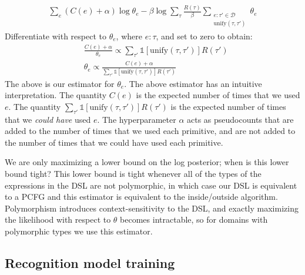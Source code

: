 \documentclass{article}
\newcommand{\indicator}{\mathds{1}} %
\begin{document}
\begin{align}
\sum_e (C(e) + \alpha)\log \theta_e  - \beta\log \sum_\tau\frac{R(\tau)}{\beta}\sum_{\substack{e:\tau'\in \mathcal{D}\\\text{unify}(\tau,\tau')}}\theta_e    
\end{align}
Differentiate with respect to $\theta_e$, where $e:\tau$, and set to zero to obtain:
\begin{align}
  &  \frac{C(e) + \alpha}{\theta_e}\propto\sum_{\tau'}\indicator\left[\text{unify}(\tau,\tau') \right] R(\tau')\\
&  \theta_e\propto\frac{C(e) + \alpha}{\sum_{\tau'}\indicator\left[\text{unify}(\tau,\tau') \right] R(\tau')}
\end{align}
The above is our estimator for $\theta_e$.
The above estimator has an intuitive interpretation.
The quantity $C(e)$ is the expected number of times that we used $e$.
The quantity $\sum_{\tau'}\indicator\left[\text{unify}(\tau,\tau') \right] R(\tau')$
is the expected number of times that we \emph{could have} used $e$.
The hyperparameter $\alpha$ acts as pseudocounts that are
added to the number of times that we used each primitive,
and are not added to the number of times that we could have used each primitive.


We are only maximizing a lower bound on the log posterior; when is this lower bound tight?
This lower bound is tight whenever all
of the types of the expressions in the DSL are not polymorphic, in which case our DSL is equivalent to a PCFG
and this estimator is equivalent to the inside/outside algorithm.
Polymorphism introduces context-sensitivity to the DSL,
and exactly maximizing the likelihood with respect to $\theta$
becomes intractable,
so for domains with polymorphic types we use this estimator.

\subsection{Recognition model training}\label{recognitionAppendix}
\end{document}
